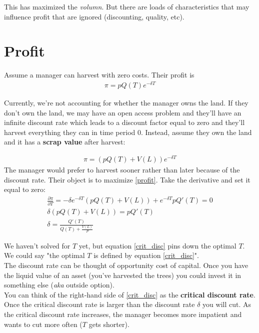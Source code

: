 \documentclass[12pt]{article}
\begin{document}
This has maximized the \textit{volumn}. But there are loads of characteristics that may influence profit that are ignored (discounting, quality, etc). \\

\section{Profit}

Assume a manager can harvest with zero costs. Their profit is 
\begin{align}
    \pi = p Q(T) e^{-\delta T}
\end{align}

Currently, we're not accounting for whether the manager owns the land. If they don't own the land, we may have an open access problem and they'll have an infinite discount rate which leads to a discount factor equal to zero and they'll harvest everything they can in time period 0. Instead, assume they own the land and it has a \textbf{scrap value} after harvest:

\begin{align}
    \pi = (pQ(T) + V(L)) e^{-\delta T} \label{profit}
\end{align}
The manager would prefer to harvest sooner rather than later because of the discount rate. Their object is to maximize \ref{profit}. Take the derivative and set it equal to zero:
\begin{align}
    \frac{\partial \pi}{\partial T} = -\delta e^{-\delta T } (pQ(T) + V(L)) + e^{-\delta T}p Q'(T) = 0\\
    \delta (pQ(T) + V(L)) = pQ'(T)\\
    \delta = \frac{Q'(T)}{Q(T) + \frac{V(L)}{P}} \label{crit_disc}
\end{align}

We haven't solved for $T$ yet, but equation \ref{crit_disc} pins down the optimal $T$. We could say "the optimal $T$ is defined by equation \ref{crit_disc}".\\

The discount rate can be thought of opportunity cost of capital. Once you have the liquid value of an asset (you've harvested the trees) you could invest it in something else (\textit{aka} outside option). \\

You can think of the right-hand side of \ref{crit_disc} as the \textbf{critical discount rate}. Once the critical discount rate is larger than the discount rate $\delta$ you will cut. As the critical discount rate increases, the manager becomes more impatient and wants to cut more often ($T$ gets shorter).\\
\end{document}
